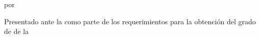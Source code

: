 \begin{titlepage}
\centering

\begin{minipage}[t]{0.49\textwidth}
  \raggedright
\end{minipage}
\hfill
\begin{minipage}[t]{0.49\textwidth}
  \raggedleft
\end{minipage}

\vspace{1.8cm}

{\Large\bfseries \ThesisTitle\par}

\vspace{1cm}
por\par
\vspace{0.3cm}
{\large \ThesisAuthor\par}

\vspace{1.6cm}

Presentado ante la \MakeUppercase{\ThesisFaculty}
como parte de los requerimientos para la obtención del grado de
\ThesisAwardDegree{} de la

\vspace{0.8cm}
{\MakeUppercase{\ThesisUniversity}\par}

\vspace{0.9cm}
\ThesisDate\par

\vspace{1.2cm}
\ThesisAdvisor\par

\vfill
\begin{minipage}{0.95\textwidth}
  \centering\small
  {\Large\ccLogo\par}
  \vspace{0.2cm}
  \ThesisLicense
\end{minipage}

\end{titlepage}
